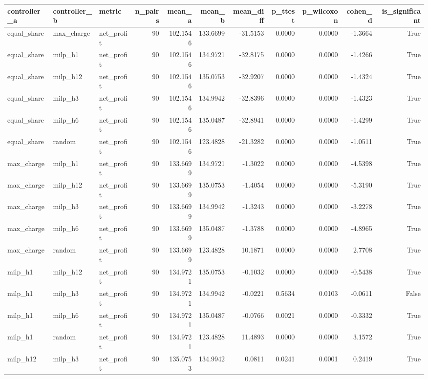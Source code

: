 \begin{tabular}{lllrrrrrrrr}
\toprule
controller_a & controller_b & metric & n_pairs & mean_a & mean_b & mean_diff & p_ttest & p_wilcoxon & cohen_d & is_significant \\
\midrule
equal_share & max_charge & net_profit & 90 & 102.1546 & 133.6699 & -31.5153 & 0.0000 & 0.0000 & -1.3664 & True \\
equal_share & milp_h1 & net_profit & 90 & 102.1546 & 134.9721 & -32.8175 & 0.0000 & 0.0000 & -1.4266 & True \\
equal_share & milp_h12 & net_profit & 90 & 102.1546 & 135.0753 & -32.9207 & 0.0000 & 0.0000 & -1.4324 & True \\
equal_share & milp_h3 & net_profit & 90 & 102.1546 & 134.9942 & -32.8396 & 0.0000 & 0.0000 & -1.4323 & True \\
equal_share & milp_h6 & net_profit & 90 & 102.1546 & 135.0487 & -32.8941 & 0.0000 & 0.0000 & -1.4299 & True \\
equal_share & random & net_profit & 90 & 102.1546 & 123.4828 & -21.3282 & 0.0000 & 0.0000 & -1.0511 & True \\
max_charge & milp_h1 & net_profit & 90 & 133.6699 & 134.9721 & -1.3022 & 0.0000 & 0.0000 & -4.5398 & True \\
max_charge & milp_h12 & net_profit & 90 & 133.6699 & 135.0753 & -1.4054 & 0.0000 & 0.0000 & -5.3190 & True \\
max_charge & milp_h3 & net_profit & 90 & 133.6699 & 134.9942 & -1.3243 & 0.0000 & 0.0000 & -3.2278 & True \\
max_charge & milp_h6 & net_profit & 90 & 133.6699 & 135.0487 & -1.3788 & 0.0000 & 0.0000 & -4.8965 & True \\
max_charge & random & net_profit & 90 & 133.6699 & 123.4828 & 10.1871 & 0.0000 & 0.0000 & 2.7708 & True \\
milp_h1 & milp_h12 & net_profit & 90 & 134.9721 & 135.0753 & -0.1032 & 0.0000 & 0.0000 & -0.5438 & True \\
milp_h1 & milp_h3 & net_profit & 90 & 134.9721 & 134.9942 & -0.0221 & 0.5634 & 0.0103 & -0.0611 & False \\
milp_h1 & milp_h6 & net_profit & 90 & 134.9721 & 135.0487 & -0.0766 & 0.0021 & 0.0000 & -0.3332 & True \\
milp_h1 & random & net_profit & 90 & 134.9721 & 123.4828 & 11.4893 & 0.0000 & 0.0000 & 3.1572 & True \\
milp_h12 & milp_h3 & net_profit & 90 & 135.0753 & 134.9942 & 0.0811 & 0.0241 & 0.0001 & 0.2419 & True \\

\end{tabular}
